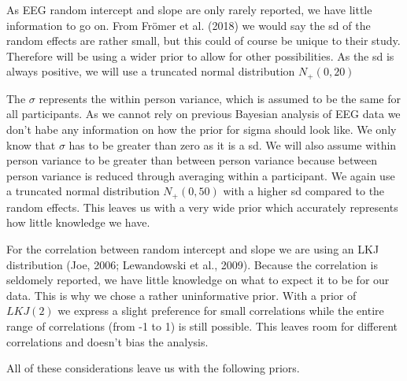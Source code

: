 \documentclass[
  doc,12pt,floatsintext]{apa7}
\begin{document}
As EEG random intercept and slope are only rarely reported, we have little information to go on. From Frömer et al. (2018) we would say the sd of the random effects are rather small, but this could of course be unique to their study. Therefore will be using a wider prior to allow for other possibilities. As the sd is always positive, we will use a truncated normal distribution \(N_+(0, 20)\)

The \(\sigma\) represents the within person variance, which is assumed to be the same for all participants. As we cannot rely on previous Bayesian analysis of EEG data we don't habe any information on how the prior for sigma should look like. We only know that \(\sigma\) has to be greater than zero as it is a sd. We will also assume within person variance to be greater than between person variance because between person variance is reduced through averaging within a participant. We again use a truncated normal distribution \(N_+(0, 50)\) with a higher sd compared to the random effects. This leaves us with a very wide prior which accurately represents how little knowledge we have.

For the correlation between random intercept and slope we are using an LKJ distribution (Joe, 2006; Lewandowski et al., 2009). Because the correlation is seldomely reported, we have little knowledge on what to expect it to be for our data. This is why we chose a rather uninformative prior. With a prior of \(LKJ(2)\) we express a slight preference for small correlations while the entire range of correlations (from -1 to 1) is still possible. This leaves room for different correlations and doesn't bias the analysis.

All of these considerations leave us with the following priors.
\end{document}

